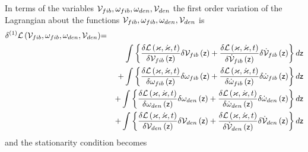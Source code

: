 In terms of the variables ${\cal V}_{fib},\omega _{fib},\omega _{den},{\cal V%
}_{den}$ the first order variation of the Lagrangian about the functions $%
{\cal V}_{fib},\omega _{fib},\omega _{den},{\cal V}_{den}$ is 
\begin{eqnarray}
\delta ^{\left( 1\right) }{\cal L}\left( {\cal V}_{fib},\omega _{fib},\omega
_{den},{\cal V}_{den}\right) &{\cal =}&  \nonumber \\
&&\int \left\{ \frac{\delta {\cal L}\left( \varkappa ,\dot{\varkappa}%
,t\right) }{\delta {\cal V}_{fib}\left( {\sf z}\right) }\delta {\cal V}%
_{fib}\left( {\sf z}\right) +\frac{\delta {\cal L}\left( \varkappa ,\dot{%
\varkappa},t\right) }{\delta {\cal \dot{V}}_{fib}\left( {\sf z}\right) }%
\delta {\cal \dot{V}}_{fib}\left( {\sf z}\right) \right\} d{\sf z}  \nonumber
\\
&&+\int \left\{ \frac{\delta {\cal L}\left( \varkappa ,\dot{\varkappa}%
,t\right) }{\delta {\cal \omega }_{fib}\left( {\sf z}\right) }\delta {\cal %
\omega }_{fib}\left( {\sf z}\right) +\frac{\delta {\cal L}\left( \varkappa ,%
\dot{\varkappa},t\right) }{\delta {\cal \dot{\omega}}_{fib}\left( {\sf z}%
\right) }\delta {\cal \dot{\omega}}_{fib}\left( {\sf z}\right) \right\} d%
{\sf z}  \nonumber \\
&&+\int \left\{ \frac{\delta {\cal L}\left( \varkappa ,\dot{\varkappa}%
,t\right) }{\delta {\cal \omega }_{den}\left( {\sf z}\right) }\delta {\cal %
\omega }_{den}\left( {\sf z}\right) +\frac{\delta {\cal L}\left( \varkappa ,%
\dot{\varkappa},t\right) }{\delta {\cal \dot{\omega}}_{den}\left( {\sf z}%
\right) }\delta {\cal \dot{\omega}}_{den}\left( {\sf z}\right) \right\} d%
{\sf z}  \nonumber \\
&&+\int \left\{ \frac{\delta {\cal L}\left( \varkappa ,\dot{\varkappa}%
,t\right) }{\delta {\cal V}_{den}\left( {\sf z}\right) }\delta {\cal V}%
_{den}\left( {\sf z}\right) +\frac{\delta {\cal L}\left( \varkappa ,\dot{%
\varkappa},t\right) }{\delta {\cal \dot{V}}_{den}\left( {\sf z}\right) }%
\delta {\cal \dot{V}}_{den}\left( {\sf z}\right) \right\} d{\sf z}
\end{eqnarray}%
and the stationarity condition becomes

